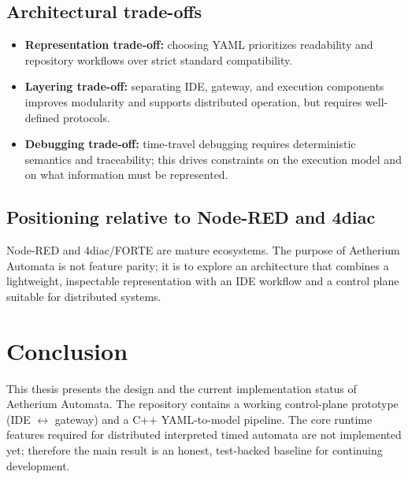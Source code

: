 \section{Architectural trade-offs}
\begin{itemize}
  \item \textbf{Representation trade-off:} choosing YAML prioritizes readability and repository workflows over strict standard compatibility.
  \item \textbf{Layering trade-off:} separating IDE, gateway, and execution components improves modularity and supports distributed operation, but requires well-defined protocols.
  \item \textbf{Debugging trade-off:} time-travel debugging requires deterministic semantics and traceability; this drives constraints on the execution model and on what information must be represented.
\end{itemize}

\section{Positioning relative to Node-RED and 4diac}
Node-RED and 4diac/FORTE are mature ecosystems.
The purpose of Aetherium Automata is not feature parity; it is to explore an architecture that combines a lightweight, inspectable representation with an IDE workflow and a control plane suitable for distributed systems.

\chapter{Conclusion}

This thesis presents the design and the current implementation status of Aetherium Automata.
The repository contains a working control-plane prototype (IDE $\leftrightarrow$ gateway) and a C++ YAML-to-model pipeline.
The core runtime features required for distributed interpreted timed automata are not implemented yet; therefore the main result is an honest, test-backed baseline for continuing development.

\endinput

Even though some students only need to know and comply with the official formal requirements stated in regulations as well as typographical principles to write a good diploma thesis (a bachelor's thesis is a diploma thesis too -- you get a diploma for it), it is never a~bad idea to familiarize yourself with some of the well-established procedures for writing a~technical text and make things easier for yourself. Some supervisors had prepared breakdowns of proven procedures that have led to tens of successfully presented academic works. A~selection of the most interesting procedures available to the authors of this work at the time of writing can be found in the chapters below. If your supervisor has their own web page with recommended procedures, you can skip these chapters and follow their instructions instead. If that is not the case, you should read the respective chapters prior to consulting your supervisor about the structure and contents of your academic work.

